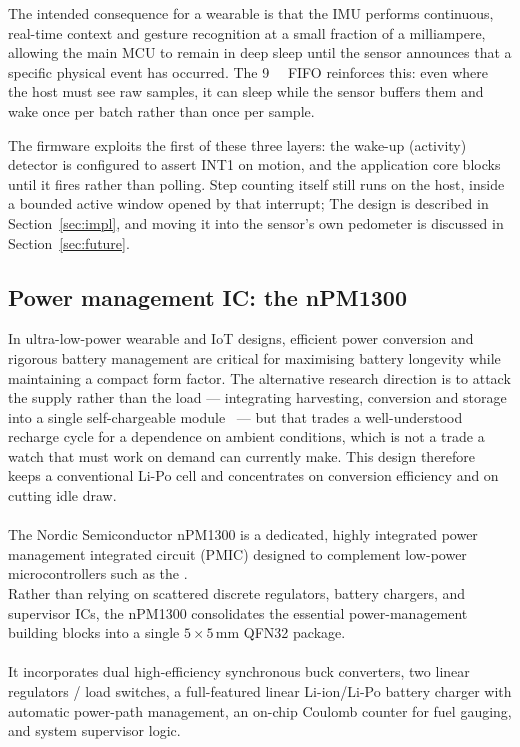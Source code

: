 \documentclass[12pt, a4paper]{article}
\begin{document}
The intended consequence for a wearable is that the IMU performs continuous,
real-time context and gesture recognition at a small fraction of a milliampere,
allowing the main MCU to remain in deep sleep until the sensor announces that a
specific physical event has occurred. The \SI{9}{\kibi\byte} FIFO reinforces
this: even where the host must see raw samples, it can sleep while the sensor
buffers them and wake once per batch rather than once per sample.

The firmware exploits the first of these three layers: the wake-up (activity)
detector is configured to assert INT1 on motion, and the application core
blocks until it fires rather than polling. Step counting itself still runs on
the host, inside a bounded active window opened by that interrupt; The
design is described in Section~\ref{sec:impl}, and moving it into the sensor's
own pedometer is discussed in Section~\ref{sec:future}.

\subsection{Power management IC: the nPM1300}
\label{comp:npm1300}
In ultra-low-power wearable and IoT designs, efficient power conversion and
rigorous battery management are critical for maximising battery longevity while
maintaining a compact form factor. The alternative research direction is to
attack the supply rather than the load --- integrating harvesting, conversion and
storage into a single self-chargeable module~\cite{maharjan2020} --- but that
trades a well-understood recharge cycle for a dependence on ambient conditions,
which is not a trade a watch that must work on demand can currently make. This
design therefore keeps a conventional Li-Po cell and concentrates on conversion
efficiency and on cutting idle draw.\\\\
The Nordic Semiconductor nPM1300 is a
dedicated, highly integrated power management integrated circuit (PMIC) designed
to complement low-power microcontrollers such as the .\\
Rather than relying on scattered discrete regulators, battery chargers, and
supervisor ICs, the nPM1300 consolidates the essential power-management building
blocks into a single $5\times 5\,\text{mm}$ QFN32 package.\\\\
It incorporates dual
high-efficiency synchronous buck converters, two linear regulators / load
switches, a full-featured linear Li-ion/Li-Po battery charger with automatic
power-path management, an on-chip Coulomb counter for fuel gauging, and system
supervisor logic.
\end{document}
